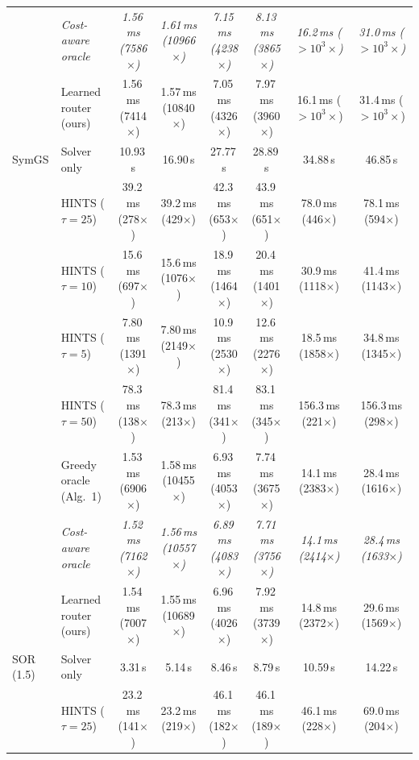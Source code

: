 {\begin{tabular}{llcccccc}
 & \textit{Cost-aware oracle} & \textit{1.56\,ms (7586$\times$)} & \textit{1.61\,ms (10966$\times$)} & \textit{7.15\,ms (4238$\times$)} & \textit{8.13\,ms (3865$\times$)} & \textit{16.2\,ms ($>10^{3}\times$)} & \textit{31.0\,ms ($>10^{3}\times$)} \\
 & Learned router (ours) & 1.56\,ms (7414$\times$) & 1.57\,ms (10840$\times$) & 7.05\,ms (4326$\times$) & 7.97\,ms (3960$\times$) & 16.1\,ms ($>10^{3}\times$) & 31.4\,ms ($>10^{3}\times$) \\
\midrule
SymGS & Solver only & 10.93\,s & 16.90\,s & 27.77\,s & 28.89\,s & 34.88\,s & 46.85\,s \\
 & HINTS ($\tau{=}25$) & 39.2\,ms (278$\times$) & 39.2\,ms (429$\times$) & 42.3\,ms (653$\times$) & 43.9\,ms (651$\times$) & 78.0\,ms (446$\times$) & 78.1\,ms (594$\times$) \\
 & HINTS ($\tau{=}10$) & 15.6\,ms (697$\times$) & 15.6\,ms (1076$\times$) & 18.9\,ms (1464$\times$) & 20.4\,ms (1401$\times$) & 30.9\,ms (1118$\times$) & 41.4\,ms (1143$\times$) \\
 & HINTS ($\tau{=}5$) & 7.80\,ms (1391$\times$) & 7.80\,ms (2149$\times$) & 10.9\,ms (2530$\times$) & 12.6\,ms (2276$\times$) & 18.5\,ms (1858$\times$) & 34.8\,ms (1345$\times$) \\
 & HINTS ($\tau{=}50$) & 78.3\,ms (138$\times$) & 78.3\,ms (213$\times$) & 81.4\,ms (341$\times$) & 83.1\,ms (345$\times$) & 156.3\,ms (221$\times$) & 156.3\,ms (298$\times$) \\
 & Greedy oracle (Alg.~1) & 1.53\,ms (6906$\times$) & 1.58\,ms (10455$\times$) & 6.93\,ms (4053$\times$) & 7.74\,ms (3675$\times$) & 14.1\,ms (2383$\times$) & 28.4\,ms (1616$\times$) \\
 & \textit{Cost-aware oracle} & \textit{1.52\,ms (7162$\times$)} & \textit{1.56\,ms (10557$\times$)} & \textit{6.89\,ms (4083$\times$)} & \textit{7.71\,ms (3756$\times$)} & \textit{14.1\,ms (2414$\times$)} & \textit{28.4\,ms (1633$\times$)} \\
 & Learned router (ours) & 1.54\,ms (7007$\times$) & 1.55\,ms (10689$\times$) & 6.96\,ms (4026$\times$) & 7.92\,ms (3739$\times$) & 14.8\,ms (2372$\times$) & 29.6\,ms (1569$\times$) \\
\midrule
SOR (1.5) & Solver only & 3.31\,s & 5.14\,s & 8.46\,s & 8.79\,s & 10.59\,s & 14.22\,s \\
 & HINTS ($\tau{=}25$) & 23.2\,ms (141$\times$) & 23.2\,ms (219$\times$) & 46.1\,ms (182$\times$) & 46.1\,ms (189$\times$) & 46.1\,ms (228$\times$) & 69.0\,ms (204$\times$) \\

\end{tabular}}
